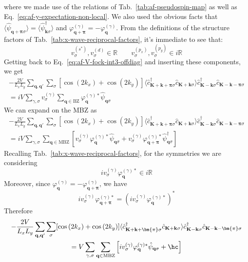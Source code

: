 where we made use of the relations of Tab.~\ref{tab:af-pseudospin-map} as well as Eq.~\eqref{eq:af-y-expectation-non-local}. We also used the obvious facts that $\langle \hat \psi_{\mathbf{q}+\bm{\pi}\sigma} \rangle = \langle \hat \psi_{\mathbf{k}\sigma}^\dagger \rangle$ and $\varphi_{\mathbf{q}+\bm{\pi}}^{(\gamma)} = -\varphi_\mathbf{q}^{(\gamma)}$. From the definitions of the structure factors of Tab.~\ref{tab:x-wave-reciprocal-factors}, it's immediate to see that:
\[
	v^{(s^*)}_\sigma, v^{(d)}_\sigma \in \mathbb{R}
	\qquad
	v^{(p_x)}_\sigma, v^{(p_y)}_\sigma \in i\mathbb{R}
\]
Getting back to Eq.~\eqref{eq:af-V-fock-int3-offdiag} and inserting these components, we get
\begin{multline}
	-\frac{2V}{L_x L_y} \sum_{\mathbf{q}, \mathbf{q}'} \sum_\sigma [
		\cos \left(
			2k_x
		\right)	+ \cos \left(
			2k_y
		\right)	
	] \langle
	\hat c_{\mathbf{K}+\mathbf{k}+\bm{\pi} \sigma}^\dagger 
	\hat c_{\mathbf{K}+\mathbf{k} \sigma}
	\rangle
	\hat c_{\mathbf{K}-\mathbf{k} \sigma}^\dagger \hat c_{\mathbf{K}-\mathbf{k}-\bm{\pi} \sigma} \\
	= iV \sum_{\gamma,\sigma} v^{(\gamma)}_\sigma
	\sum_{\mathbf{q}\in\mathrm{BZ}}
	\varphi_\mathbf{q}^{(\gamma)*}
	\hat \psi_{\mathbf{q}\sigma}
\end{multline}
We can expand on the MBZ as
\begin{multline}
	-\frac{2V}{L_x L_y} \sum_{\mathbf{q}, \mathbf{q}'} \sum_\sigma [
	\cos \left(
			2k_x
		\right)	+ \cos \left(
			2k_y
		\right)	
	] \langle
	\hat c_{\mathbf{K}+\mathbf{k}+\bm{\pi} \sigma}^\dagger 
	\hat c_{\mathbf{K}+\mathbf{k} \sigma}
	\rangle
	\hat c_{\mathbf{K}-\mathbf{k} \sigma}^\dagger \hat c_{\mathbf{K}-\mathbf{k}-\bm{\pi} \sigma} \\
	= iV\sum_{\gamma,\sigma}
	\sum_{\mathbf{q}\in\mathrm{MBZ}}
	\left[
		v^{(\gamma)}_\sigma \varphi_\mathbf{q}^{(\gamma)*}
		\hat \psi_{\mathbf{q}\sigma} + v^{(\gamma)}_\sigma \varphi_{\mathbf{q}+\bm{\pi}}^{(\gamma)*}
		\hat \psi_{\mathbf{q}\sigma}^\dagger
	\right]
	\label{eq:af-V-fock-int4-offdiag}
\end{multline}
Recalling Tab.~\ref{tab:x-wave-reciprocal-factors}, for the symmetries we are considering
\[
	iv^{(\gamma)}_\sigma \varphi_\mathbf{q}^{(\gamma)*} \in i\mathbb{R}
\]	
Moreover, since $\varphi_\mathbf{q}^{(\gamma)} = -\varphi_{\mathbf{q}+\bm{\pi}}^{(\gamma)}$, we have
\[
	iv^{(\gamma)}_\sigma \varphi_{\mathbf{q}+\bm{\pi}}^{(\gamma)*} = \left(
		iv^{(\gamma)}_\sigma \varphi_\mathbf{q}^{(\gamma)*}
	\right)^*
\]
Therefore
\begin{multline}
	-\frac{2V}{L_x L_y} \sum_{\mathbf{q}, \mathbf{q}'} \sum_\sigma [
		\cos \left(
			2k_x
		\right)	+ \cos \left(
			2k_y
		\right)	
	] \langle
		\hat c_{\mathbf{K}+\mathbf{k}+\bm{\pi} \sigma}^\dagger 
		\hat c_{\mathbf{K}+\mathbf{k} \sigma}
	\rangle
	\hat c_{\mathbf{K}-\mathbf{k} \sigma}^\dagger \hat c_{\mathbf{K}-\mathbf{k}-\bm{\pi} \sigma} \\
	= V\sum_{\gamma,\sigma}
	\sum_{\mathbf{q}\in\mathrm{MBZ}}
	\left[
		iv^{(\gamma)}_\sigma \varphi_\mathbf{q}^{(\gamma)*}
		\hat \psi_{\mathbf{q}\sigma} + \hc
	\right]
	\label{eq:af-V-fock-int5-offdiag}
\end{multline}

